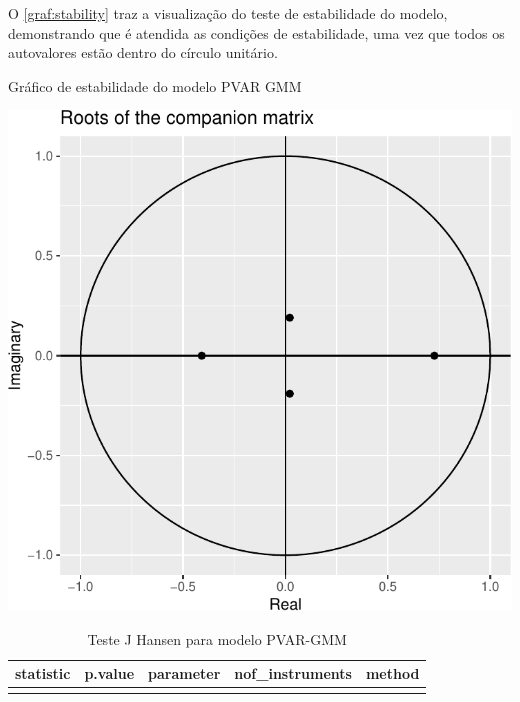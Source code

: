 \documentclass[
  12pt,
  12pt,
  openright,
  oneside,
  a4paper,
  chapter=TITLE,
  section=TITLE,
  subsection=TITLE,
  subsubsection=TITLE,
  english,
  portugues,
  sumario=tradicional]{abntex2}
\begin{document}
O \autoref{graf:stability} traz a visualização do teste de estabilidade do modelo, demonstrando que é atendida as condições de estabilidade, uma vez que todos os autovalores estão dentro do círculo unitário.

\begin{grafico}[!hbtp]
\vspace{20pt}
\caption{Gráfico de estabilidade do modelo PVAR GMM}
\vspace{-4mm}

\begin{center}\includegraphics{12-exportedfigures/stability.plot-1} \end{center}
\vspace{-3mm}
\label{graf:stability}
\vspace{-2mm}
\end{grafico}

\vspace{20pt}

\begin{table}[!hbtp]
\caption{Teste J Hansen para modelo PVAR-GMM}
\vspace{-1mm}

\begin{tabu} to 
\toprule
statistic & p.value & parameter & nof\_instruments & method\\
\midrule
{} &  &  &  & \\
\bottomrule
\end{tabu}
\vspace{1mm}
\label{tab:hansen}
\vspace{-2mm}
\end{table}
\end{document}
